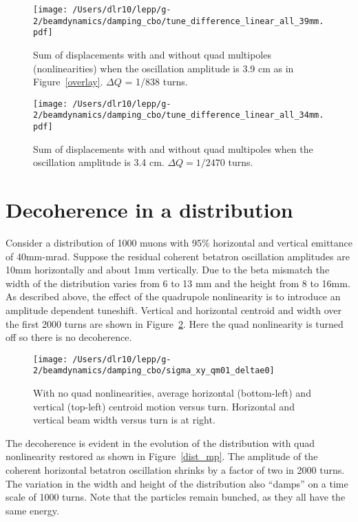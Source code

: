\documentclass[10pt]{article}
\begin{document}
\begin{figure}[htbp] %
\begin{minipage}[t]{0.48\textwidth}
   \centering
   \texttt{[image: /Users/dlr10/lepp/g-2/beamdynamics/damping\_cbo/tune\_difference\_linear\_all\_39mm.pdf]} 
   \caption{Sum of displacements with and without quad multipoles (nonlinearities) when the oscillation amplitude is 3.9 cm as in 
Figure~\ref{overlay}. $\Delta Q$ = 1/838 turns. \label{difference39}}
 \end{minipage}
\hfill
\begin{minipage}[t]{0.48\textwidth}
\centering
   \texttt{[image: /Users/dlr10/lepp/g-2/beamdynamics/damping\_cbo/tune\_difference\_linear\_all\_34mm.pdf]} 
\caption{Sum of displacements with and without quad multipoles when the oscillation amplitude is 3.4 cm. $\Delta Q = 1/2470$ turns. 
   \label{difference34}}
\end{minipage}
\end{figure}

\section{Decoherence in a distribution}
Consider a distribution of 1000 muons with 95\% horizontal and vertical emittance of 40mm-mrad. Suppose the residual coherent 
betatron oscillation amplitudes are 10mm horizontally and about 1mm vertically. Due to the beta mismatch the width of the distribution
varies from 6 to 13 mm and the height from 8 to 16mm. As described above, the effect of the quadrupole nonlinearity
is to introduce an amplitude dependent tuneshift.  Vertical and horizontal centroid and width over the first 2000 turns
are shown in Figure~\ref{distribution_nomp}. Here the quad nonlinearity is turned off so there is no decoherence.
 \begin{figure}[htbp] %
   \centering
   \texttt{[image: /Users/dlr10/lepp/g-2/beamdynamics/damping\_cbo/sigma\_xy\_qm01\_deltae0]} 
   \caption{With no quad nonlinearities, average horizontal (bottom-left) and vertical (top-left) centroid motion versus turn.
Horizontal and vertical beam width versus turn is at right. \label{distribution_nomp}}
\end{figure}
The decoherence is evident in the evolution of the distribution with quad nonlinearity restored as shown in Figure~\ref{dist_mp}. 
The amplitude of the coherent horizontal betatron oscillation shrinks by a factor of two
in 2000 turns. The variation in the width and height of the distribution also ``damps'' on a time
scale of 1000 turns. Note that the particles remain bunched, as they all have the same energy.
\end{document}
